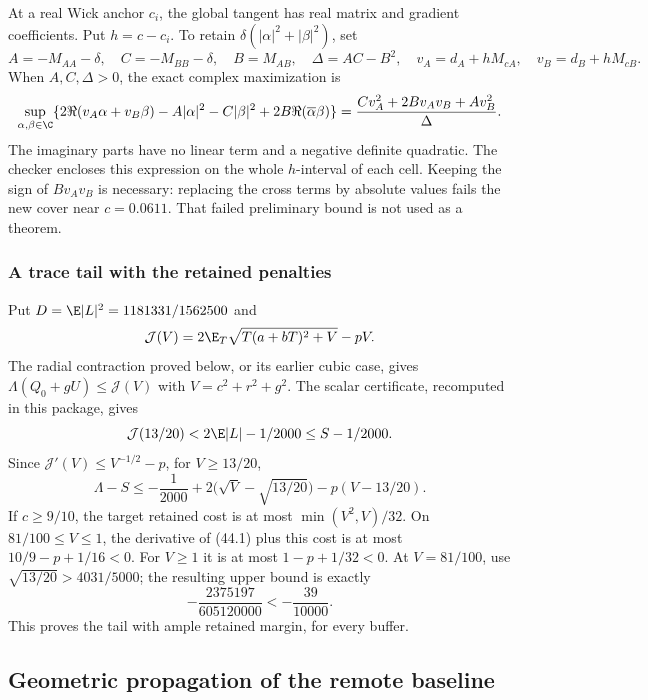 At a real Wick anchor \(c_i\), the global tangent has real matrix
and gradient coefficients. Put \(h=c-c_i\). To retain
\(\delta(|\alpha|^2+|\beta|^2)\), set
\[
 A=-M_{AA}-\delta,\quad C=-M_{BB}-\delta,\quad B=M_{AB},
 \quad \Delta=AC-B^2,\quad
 v_A=d_A+hM_{cA},\quad v_B=d_B+hM_{cB}.
\]
When \(A,C,\Delta>0\), the exact complex maximization is
\[
 \sup_{\alpha,\beta\in\C}
 \{2\Re(v_A\alpha+v_B\beta)-A|\alpha|^2-C|\beta|^2+
                       2B\Re(\overline\alpha\beta)\}
 =\frac{Cv_A^2+2Bv_Av_B+Av_B^2}{\Delta}.
\]
The imaginary parts have no linear term and a negative definite
quadratic. The checker encloses this expression on the whole
\(h\)-interval of each cell. Keeping the sign of \(Bv_Av_B\)
is necessary: replacing the cross terms by absolute values fails
the new cover near \(c=0.0611\). That failed preliminary bound is
not used as a theorem.

\subsubsection{A trace tail with the retained penalties}
Put \(D=\E|L|^2=1181331/1562500\) and
\[
 \mathcal J(V)=2\E_T\sqrt{T(a+bT)^2+V}-pV.
\]
The radial contraction proved below, or its earlier cubic case,
gives \(\Lambda(Q_0+gU)\le\mathcal J(V)\) with
\(V=c^2+r^2+g^2\).
The scalar certificate, recomputed in this package, gives
\[
 \mathcal J(13/20)<2\E|L|-1/2000\le S-1/2000.
\]
Since \(\mathcal J'(V)\le V^{-1/2}-p\), for \(V\ge13/20\),
\[
 \Lambda-S\le-\frac1{2000}
       +2\bigl(\sqrt V-\sqrt{13/20}\bigr)-p(V-13/20).
 \tag{44.1}
\]
If \(c\ge9/10\), the target retained cost is at most
\(\min(V^2,V)/32\). On \(81/100\le V\le1\), the derivative of
(44.1) plus this cost is at most \(10/9-p+1/16<0\).
For \(V\ge1\) it is at most \(1-p+1/32<0\).
At \(V=81/100\), use \(\sqrt{13/20}>4031/5000\); the resulting
upper bound is exactly
\[
 -\frac{2375197}{605120000}<-\frac{39}{10000}.
\]
This proves the tail with ample retained margin, for every buffer.


\subsection{Geometric propagation of the remote baseline}
